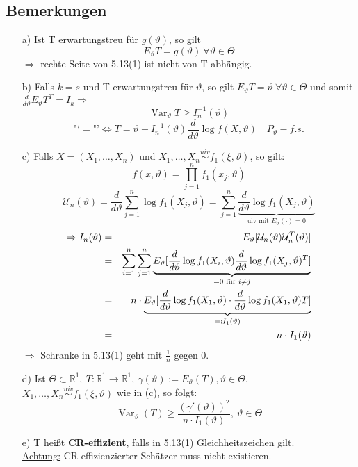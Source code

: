 \documentclass[a4paper,11pt,twoside,titlepage]{article}
\newcommand{\R}{{\mathbb R}}
\newcommand\UU{ \mathcal{U} } %
\newcommand{\uiv}{\ensuremath{\stackrel{uiv}{\sim}}}
\DeclareMathOperator{\var}{Var}
\begin{document}
\subsection{Bemerkungen}
\begin{itemize}
\item[a) ]Ist T erwartungstreu für $g(\vartheta)$, so gilt
$$E_{\vartheta}T=g(\vartheta)\ \forall \vartheta \in \Theta$$
$ \Rightarrow$ rechte Seite von 5.13(1) ist nicht von T abhängig.
\item[b) ]Falls $k=s$ und T erwartungstreu für $\vartheta$, so gilt
$E_{\vartheta}T=\vartheta\ \forall\vartheta\in\Theta$ und somit $\frac{d}{d\vartheta}E_{\vartheta}T^T=I_k\Rightarrow$ \[\var_{\vartheta}T\geq I_n^{-1}(\vartheta)\]
\[\mbox{"`}=\mbox{"'} \Leftrightarrow T=\vartheta + I_n^{-1}(\vartheta)\frac{d}{d\vartheta}\log f(X,\vartheta)\quad P_{\vartheta}-f.s.\]
\item[c) ]Falls $X=(X_1,\ldots,X_n)$ und $X_1,\ldots,X_n\uiv f_1(\xi,\vartheta)$, so gilt: $$f(x,\vartheta)=\prod_{j=1}^n f_1(x_j,\vartheta)$$
$$\UU_n(\vartheta)=\frac{d}{d\vartheta}\sum_{j=1}^n\log f_1(X_j,\vartheta)=\sum_{j=1}^n\underbrace{\frac{d}{d\vartheta}\log f_1(X_j,\vartheta)}_{\mbox{uiv mit }E_{\vartheta}(\cdot)=0}$$
\begin{eqnarray*}
\Rightarrow I_n(\vartheta)&=&E_\vartheta [\UU_n(\vartheta)\UU_n^T(\vartheta)]\\
&=&\sum_{i=1}^n\sum_{j=1}^n\underbrace{E_\vartheta[\frac{d}{d\vartheta}\log f_1(X_i,\vartheta)\frac{d}{d\vartheta}\log f_1(X_j,\vartheta)^T]}_{=0 \textnormal{ für }i \neq j}\\
&=& n\cdot \underbrace{E_\vartheta[\frac{d}{d\vartheta}\log f_1(X_1,\vartheta)\cdot \frac{d}{d\vartheta} \log f_1(X_1,\vartheta)T]}_{=:I_1(\vartheta)}\\
&=&n\cdot I_1(\vartheta)
\end{eqnarray*}
$\Rightarrow$ Schranke in 5.13(1) geht mit $\frac1n$ gegen 0.
\item[d) ]Ist $\Theta\subset\R^1,\ T:\R^1\rightarrow\R^1,\ \gamma(\vartheta):=E_\vartheta(T),\vartheta\in\Theta$,\\
$X_1,\ldots,X_n\uiv f_1(\xi,\vartheta)$ wie in (c), so folgt:
$$\var_\vartheta(T)\geq\frac{(\gamma'(\vartheta))^2}{n\cdot I_1(\vartheta)},\ \vartheta\in\Theta$$
\item[e) ] T heißt \textbf{CR-effizient}, falls in 5.13(1) Gleichheitszeichen gilt.\\
\underline{Achtung:} CR-effizienzierter Schätzer muss nicht existieren.
\end{itemize}
\end{document}
